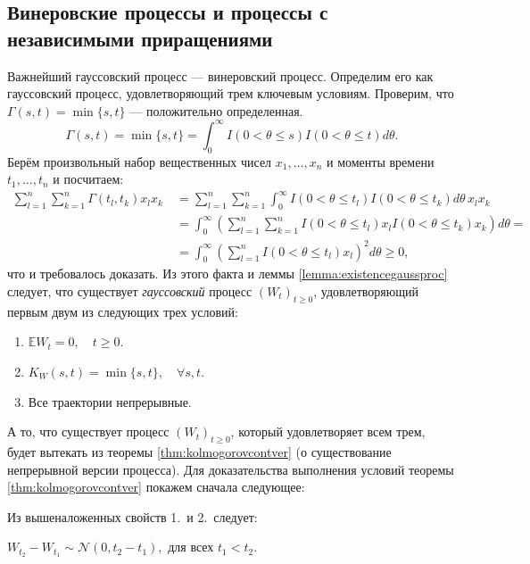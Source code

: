 \documentclass[10pt]{article}
\theoremstyle{boldnormal}
\newcommand{\EE}{{\ensuremath{\mathbb{E}}}}
\theoremstyle{boldremark}
\newenvironment{example}
  {\pushQED{\qed}\renewcommand{\qedsymbol}{$\triangle$}\examplex}
  {\popQED\endexamplex}
\begin{document}
\subsection{Винеровские процессы и процессы 
с независимыми приращениями}\label{subsection:wienerandindincr}

Важнейший гауссовский процесс --- винеровский процесс. Определим 
его как гауссовский процесс, удовлетворяющий трем ключевым условиям.
\begin{example}
Проверим, что $\Gamma(s,t) = \min\{s,t\}$ --- положительно определенная.
$$ \Gamma(s,t) = \min\{s,t\} = \int_0^\infty I(0 < \theta \leq s) I(0 < \theta \leq t) d\theta.$$
Берём произвольный набор вещественных чисел $x_1, \dots, x_n$
и моменты времени $t_1, \dots, t_n$ и посчитаем:
\begin{align*} 
\sum_{l=1}^n\sum_{k=1}^n \Gamma(t_l,t_k)x_lx_k & \ =   \sum_{l=1}^n \sum_{k=1}^n \int_0^\infty I(0 < \theta \leq t_l) I(0 < \theta \leq t_k) d\theta \, x_l x_k 
    \\
    & \ = \int_0^\infty \left( \sum_{l=1}^n \sum_{k=1}^n
    I(0 < \theta \leq t_l) x_l I(0 < \theta \leq t_k) x_k \right)
    d\theta =
 \\
    & \ = \int_0^\infty \left( \sum_{l=1}^n I(0 < \theta \leq t_l)
    x_l \right)^2 d\theta \geq 0,
\end{align*}
что и требовалось доказать.
\end{example}
Из этого факта и леммы \ref{lemma:existencegaussproc} 
следует, что существует \emph{гауссовский} процесс \((W_t)_{t\geq 0}\),
удовлетворяющий первым двум из следующих трех условий:
\begin{enumerate}
    \item $\EE W_t = 0, \quad t \geq 0$.
    \item $K_W(s,t) = \min\{s,t\}, \quad \forall s,t$.
    \item Все траектории непрерывные.
\end{enumerate}
А то, что существует процесс \((W_t)_{t\geq 0}\), который удовлетворяет 
всем трем, будет вытекать из
теоремы \ref{thm:kolmogorovcontver}
(о существование
непрерывной версии процесса).
Для доказательства
выполнения условий теоремы \ref{thm:kolmogorovcontver} 
покажем сначала следующее:
\begin{center}
Из вышеналоженных свойств 1.~и 2.~следует:

\vspace{0.2cm}
\(W_{t_2} - W_{t_1} \sim \mathcal{N}(0, t_2 - t_1), \text{ для всех } t_1 < t_2\).
\end{center}
\end{document}
